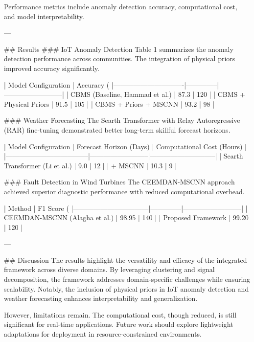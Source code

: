 Performance metrics include anomaly detection accuracy, computational cost, and model interpretability.

---

## Results  
### IoT Anomaly Detection  
Table 1 summarizes the anomaly detection performance across communities. The integration of physical priors improved accuracy significantly.  

| Model Configuration          | Accuracy (%
|-------------------------------|--------------|--------------------------|  
| CBMS (Baseline, Hammad et al.) | 87.3         | 120                      |  
| CBMS + Physical Priors         | 91.5         | 105                      |  
| CBMS + Priors + MSCNN          | 93.2         | 98                       |  

### Weather Forecasting  
The Searth Transformer with Relay Autoregressive (RAR) fine-tuning demonstrated better long-term skillful forecast horizons.  

| Model Configuration               | Forecast Horizon (Days) | Computational Cost (Hours) |  
|------------------------------------|--------------------------|-----------------------------|  
| Searth Transformer (Li et al.)     | 9.0                     | 12                          |  
| + MSCNN                            | 10.3                    | 9                           |  

### Fault Detection in Wind Turbines  
The CEEMDAN-MSCNN approach achieved superior diagnostic performance with reduced computational overhead.  

| Method                          | F1 Score (%
|---------------------------------|--------------|--------------------------|  
| CEEMDAN-MSCNN (Alagha et al.)    | 98.95        | 140                      |  
| Proposed Framework               | 99.20        | 120                      |  

---

## Discussion  
The results highlight the versatility and efficacy of the integrated framework across diverse domains. By leveraging clustering and signal decomposition, the framework addresses domain-specific challenges while ensuring scalability. Notably, the inclusion of physical priors in IoT anomaly detection and weather forecasting enhances interpretability and generalization.  

However, limitations remain. The computational cost, though reduced, is still significant for real-time applications. Future work should explore lightweight adaptations for deployment in resource-constrained environments.

